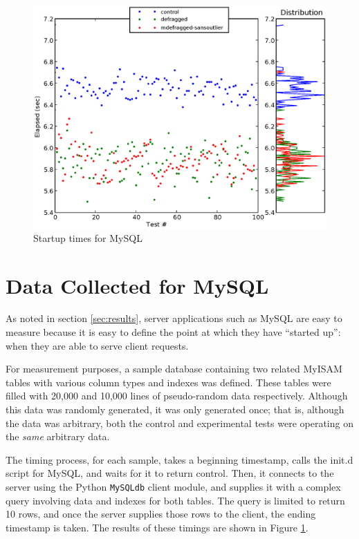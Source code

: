 \documentclass[10pt,twocolumn,letterpaper]{article}
\begin{document}
\begin{figure}[!htb]
\includegraphics[scale=0.75]{mysql-chart.eps}
\caption{Startup times for MySQL}
\label{mysqlchart}
\end{figure}

\section{Data Collected for MySQL}

As noted in section \ref{sec:results}, server applications such as MySQL are easy to measure because it is easy to define the point at which they have ``started up'': when they are able to serve client requests.

For measurement purposes, a sample database containing two related MyISAM tables with various column types and indexes was defined. These tables were filled with 20,000 and 10,000 lines of pseudo-random data respectively. Although this data was randomly generated, it was only generated once; that is, although the data was arbitrary, both the control and experimental tests were operating on the \emph{same} arbitrary data.

The timing process, for each sample, takes a beginning timestamp, calls the init.d script for MySQL, and waits for it to return control. Then, it connects to the server using the Python \texttt{MySQLdb} client module, and supplies it with a complex query involving data and indexes for both tables. The query is limited to return 10 rows, and once the
server supplies those rows to the client, the ending timestamp is taken. The results of these timings are shown in Figure \ref{mysqlchart}.
\end{document}
